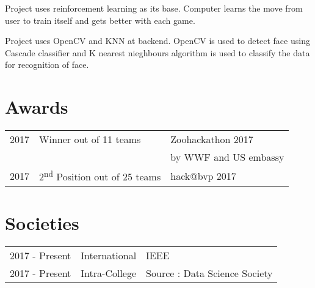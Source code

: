 \documentclass[]{deedy-resume-openfont}
\begin{document}
\begin{minipage}[t]{0.60\textwidth}
Project uses reinforcement learning as its base. Computer learns the move from user to train itself and gets better with each game.
\sectionsep

Project uses OpenCV and KNN at backend. OpenCV is used to detect face using Cascade classifier and K nearest nieghbours algorithm is used to classify the data for recognition of face.
\sectionsep


\section{Awards} 
\begin{tabular}{rll}
2017	     & Winner out of 11 teams & Zoohackathon 2017 
\\ &&by WWF and US embassy\\
2017	     & 2\textsuperscript{nd} Position out of 25 teams & hack@bvp 2017 

\end{tabular}
\sectionsep


\section{Societies} 

\begin{tabular}{rll}
2017 - Present 	&   International & IEEE \\
2017 - Present   & Intra-College   & Source : Data Science Society

\end{tabular}
\sectionsep

\end{minipage} 
\end{document}
